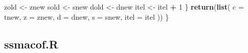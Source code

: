 \documentclass[
  12pt,
]{article}
\newenvironment{Shaded}{\begin{snugshade}}{\end{snugshade}}
\newcommand{\AttributeTok}[1]{\textcolor[rgb]{0.13,0.29,0.53}{#1}}
\newcommand{\DecValTok}[1]{\textcolor[rgb]{0.00,0.00,0.81}{#1}}
\newcommand{\FunctionTok}[1]{\textcolor[rgb]{0.13,0.29,0.53}{\textbf{#1}}}
\newcommand{\NormalTok}[1]{#1}
\newcommand{\OtherTok}[1]{\textcolor[rgb]{0.56,0.35,0.01}{#1}}
\newcommand{\SpecialCharTok}[1]{\textcolor[rgb]{0.81,0.36,0.00}{\textbf{#1}}}
\begin{document}
\begin{Shaded}
\begin{Highlighting}[]
\NormalTok{      zold }\OtherTok{\textless{}{-}}\NormalTok{ znew}
\NormalTok{      sold }\OtherTok{\textless{}{-}}\NormalTok{ snew}
\NormalTok{      dold }\OtherTok{\textless{}{-}}\NormalTok{ dnew}
\NormalTok{      itel }\OtherTok{\textless{}{-}}\NormalTok{ itel }\SpecialCharTok{+} \DecValTok{1}
\NormalTok{    \}}
    \FunctionTok{return}\NormalTok{(}\FunctionTok{list}\NormalTok{(}
      \AttributeTok{c =}\NormalTok{ tnew,}
      \AttributeTok{z =}\NormalTok{ znew,}
      \AttributeTok{d =}\NormalTok{ dnew,}
      \AttributeTok{s =}\NormalTok{ snew,}
      \AttributeTok{itel =}\NormalTok{ itel}
\NormalTok{    ))}
\NormalTok{  \}}
\end{Highlighting}
\end{Shaded}

\subsection{ssmacof.R}\label{ssmacof.r}
\end{document}
